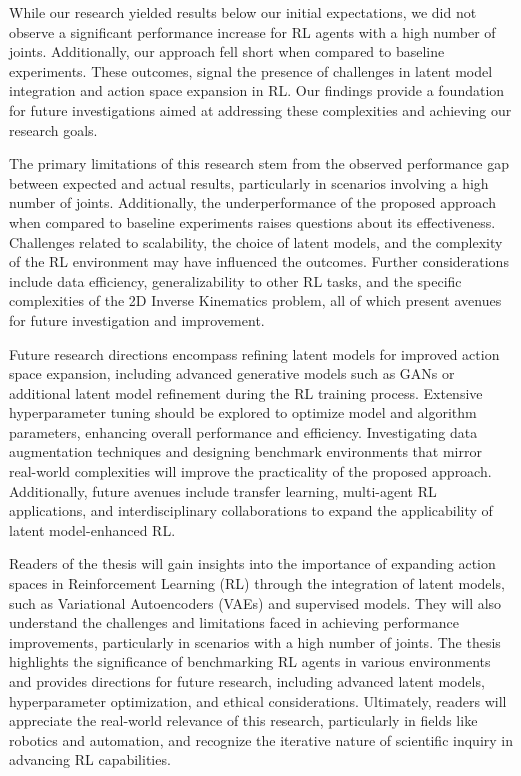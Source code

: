 While our research yielded results below our initial expectations, we did not observe a significant performance increase for RL agents with a high number of joints. Additionally, our approach fell short when compared to baseline experiments. These outcomes, signal the presence of challenges in latent model integration and action space expansion in RL. Our findings provide a foundation for future investigations aimed at addressing these complexities and achieving our research goals.

The primary limitations of this research stem from the observed performance gap between expected and actual results, particularly in scenarios involving a high number of joints. Additionally, the underperformance of the proposed approach when compared to baseline experiments raises questions about its effectiveness. Challenges related to scalability, the choice of latent models, and the complexity of the RL environment may have influenced the outcomes. Further considerations include data efficiency, generalizability to other RL tasks, and the specific complexities of the 2D Inverse Kinematics problem, all of which present avenues for future investigation and improvement.

Future research directions encompass refining latent models for improved action space expansion, including advanced generative models such as GANs or additional latent model refinement during the RL training process. Extensive hyperparameter tuning should be explored to optimize model and algorithm parameters, enhancing overall performance and efficiency. Investigating data augmentation techniques and designing benchmark environments that mirror real-world complexities will improve the practicality of the proposed approach. Additionally, future avenues include transfer learning, multi-agent RL applications, and interdisciplinary collaborations to expand the applicability of latent model-enhanced RL. 

Readers of the thesis will gain insights into the importance of expanding action spaces in Reinforcement Learning (RL) through the integration of latent models, such as Variational Autoencoders (VAEs) and supervised models. They will also understand the challenges and limitations faced in achieving performance improvements, particularly in scenarios with a high number of joints. The thesis highlights the significance of benchmarking RL agents in various environments and provides directions for future research, including advanced latent models, hyperparameter optimization, and ethical considerations. Ultimately, readers will appreciate the real-world relevance of this research, particularly in fields like robotics and automation, and recognize the iterative nature of scientific inquiry in advancing RL capabilities.
